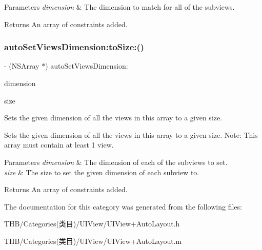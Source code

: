 \begin{DoxyParams}{Parameters}
{\em dimension} & The dimension to match for all of the subviews. \\
\hline
\end{DoxyParams}
\begin{DoxyReturn}{Returns}
An array of constraints added. 
\end{DoxyReturn}
\mbox{\label{category_n_s_array_07_auto_layout_08_a49d4d37abcfd84afc7d1bebe065f2d0d}} 
\subsubsection{\texorpdfstring{auto\+Set\+Views\+Dimension\+:to\+Size\+:()}{autoSetViewsDimension:toSize:()}}
{\footnotesize\ttfamily -\/ (N\+S\+Array $\ast$) auto\+Set\+Views\+Dimension\+: \begin{DoxyParamCaption}\item[{(A\+L\+Dimension)}]{dimension }\item[{toSize:(C\+G\+Float)}]{size }\end{DoxyParamCaption}}

Sets the given dimension of all the views in this array to a given size.

Sets the given dimension of all the views in this array to a given size. Note\+: This array must contain at least 1 view.


\begin{DoxyParams}{Parameters}
{\em dimension} & The dimension of each of the subviews to set. \\
\hline
{\em size} & The size to set the given dimension of each subview to. \\
\hline
\end{DoxyParams}
\begin{DoxyReturn}{Returns}
An array of constraints added. 
\end{DoxyReturn}


The documentation for this category was generated from the following files\+:\begin{DoxyCompactItemize}
\item 
T\+H\+B/\+Categories(类目)/\+U\+I\+View/U\+I\+View+\+Auto\+Layout.\+h\item 
T\+H\+B/\+Categories(类目)/\+U\+I\+View/U\+I\+View+\+Auto\+Layout.\+m\end{DoxyCompactItemize}
